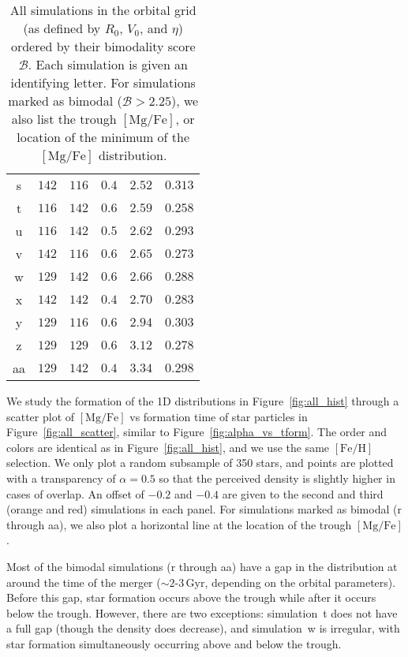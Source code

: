 \documentclass[twocolumn,linenumbers,trackchanges]{aastex631}
\newcommand{\Gyr}{\ensuremath{\textrm{Gyr}}}
\newcommand{\FeH}{\ensuremath{[\textrm{Fe}/\textrm{H}]}}
\newcommand{\MgFe}{\ensuremath{[\textrm{Mg}/\textrm{Fe}]}}
\begin{document}
\begin{table}[]
\begin{tabular}{cccccc}
s                 & $142$ & $116$ & $0.4$  & $2.52$        & $0.313$                    \\
t                 & $116$ & $142$ & $0.6$  & $2.59$        & $0.258$                    \\
u                 & $116$ & $142$ & $0.5$  & $2.62$        & $0.293$                    \\
v                 & $142$ & $116$ & $0.6$  & $2.65$        & $0.273$                    \\
w                 & $129$ & $142$ & $0.6$  & $2.66$        & $0.288$                    \\
x                 & $142$ & $142$ & $0.4$  & $2.70$        & $0.283$                    \\
y                 & $129$ & $116$ & $0.6$  & $2.94$        & $0.303$                    \\
z                 & $129$ & $129$ & $0.6$  & $3.12$        & $0.278$                    \\
aa                & $129$ & $142$ & $0.4$  & $3.34$        & $0.298$                   
\end{tabular}
\caption{All simulations in the orbital grid (as defined by $R_0$, $V_0$, and $\eta$) ordered by their bimodality score $\mathcal{B}$. Each simulation is given an identifying letter. For simulations marked as bimodal ($\mathcal{B}>2.25$), we also list the trough \MgFe{}, or location of the minimum of the \MgFe{} distribution.}
\label{tab:my-table}
\end{table}

We study the formation of the 1D distributions in Figure~\ref{fig:all_hist} through a scatter plot of \MgFe{} vs formation time of star particles in Figure~\ref{fig:all_scatter}, similar to Figure~\ref{fig:alpha_vs_tform}. The order and colors are identical as in Figure~\ref{fig:all_hist}, and we use the same \FeH{} selection. We only plot a random subsample of 350 stars, and points are plotted with a transparency of $\alpha=0.5$ so that the perceived density is slightly higher in cases of overlap. An offset of $-0.2$ and $-0.4$ are given to the second and third (orange and red) simulations in each panel. For simulations marked as bimodal (r through aa), we also plot a horizontal line at the location of the trough \MgFe{}.

Most of the bimodal simulations (r through aa) have a gap in the distribution at around the time of the merger ($\sim2$-$3\,\Gyr$, depending on the orbital parameters). Before this gap, star formation occurs above the trough while after it occurs below the trough. However, there are two exceptions: simulation~t does not have a full gap (though the density does decrease), and simulation~w is irregular, with star formation simultaneously occurring above and below the trough.
\end{document}
